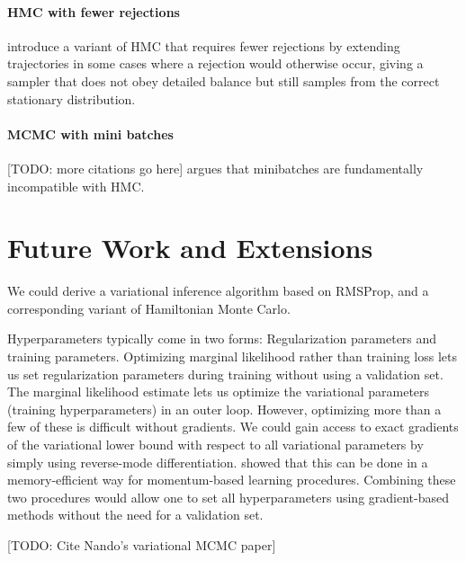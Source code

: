 \documentclass[]{article}
\begin{document}
\paragraph{HMC with fewer rejections}
\citet{sohl2014hamiltonian} introduce a variant of HMC that requires fewer rejections by extending trajectories in some cases where a rejection would otherwise occur, giving a sampler that does not obey detailed balance but still samples from the correct stationary distribution.

\paragraph{MCMC with mini batches}
[TODO: more citations go here]
\citet{betancourt2015fundamental} argues that minibatches are fundamentally incompatible with HMC.


\section{Future Work and Extensions}

We could derive a variational inference algorithm based on RMSProp, and a corresponding variant of Hamiltonian Monte Carlo.

Hyperparameters typically come in two forms:
Regularization parameters and training parameters.
Optimizing marginal likelihood rather than training loss lets us set regularization parameters during training without using a validation set.
The marginal likelihood estimate lets us optimize the variational parameters (training hyperparameters) in an outer loop.
However, optimizing more than a few of these is difficult without gradients.
We could gain access to exact gradients of the variational lower bound with respect to all variational parameters by simply using reverse-mode differentiation.
\citet{MacDuvAda2015hyper} showed that this can be done in a memory-efficient way for momentum-based learning procedures.
Combining these two procedures would allow one to set all hyperparameters using gradient-based methods without the need for a validation set.



[TODO: Cite Nando's variational MCMC paper]




\end{document}
